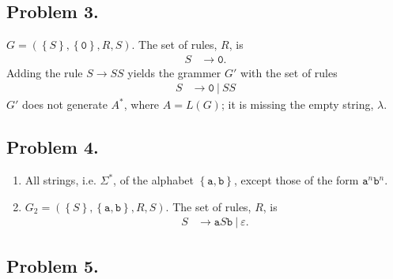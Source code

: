 \documentclass{article}
\begin{document}
\subsection*{Problem 3.}

\(G = \left(\left\{S\right\}, \left\{\texttt{0}\right\}, R, S\right)\).  The set of rules, \(R\), is
  \begin{align*}
    S &\rightarrow \texttt{0}.
  \end{align*}
Adding the rule \(S \rightarrow SS\) yields the grammer \(G'\) with the set of rules
  \begin{align*}
    S &\rightarrow \texttt{0}\:|\:SS
  \end{align*}
\(G'\) does not generate \(A^*\), where \(A = L\left(G\right)\); it is missing the empty string, \(\lambda\).


\subsection*{Problem 4.}

\begin{enumerate}
  \item All strings, i.e. \(\Sigma^*\), of the alphabet \(\left\{\texttt{a}, \texttt{b}\right\}\), except those of the form \(\texttt{a}^n\texttt{b}^n\).
  \item \(G_2 = \left(\left\{S\right\}, \left\{\texttt{a}, \texttt{b}\right\}, R, S\right)\).  The set of rules, \(R\), is
    \begin{align*}
      S &\rightarrow \texttt{a}S\texttt{b}\:|\:\varepsilon.
    \end{align*}
\end{enumerate}


\subsection*{Problem 5.}
\end{document}
